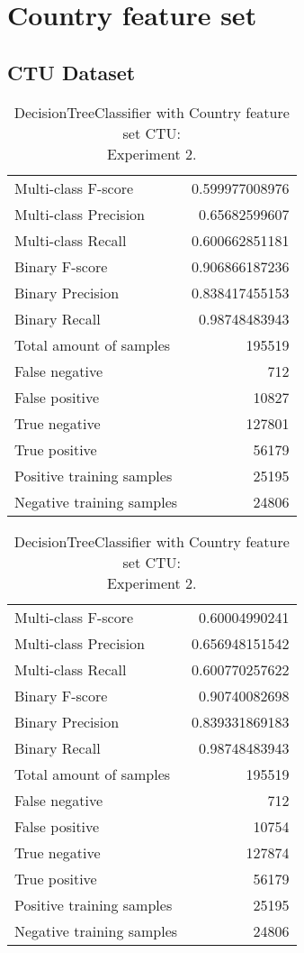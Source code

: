 \newpage
\section{Country feature set}
\subsection{CTU Dataset}

\begin{table}[H]
\begin{minipage}{0.5\textwidth}
\caption{DecisionTreeClassifier with Country feature set CTU: \\Experiment 1.}
\centering
\begin{tabular}{l r}
\toprule
Multi-class F-score & 0.599977008976 \\
Multi-class Precision & 0.65682599607 \\
Multi-class Recall & 0.600662851181 \\
\midrule
Binary F-score & 0.906866187236 \\
Binary Precision & 0.838417455153 \\
Binary Recall & 0.98748483943 \\
\midrule
Total amount of samples & 195519 \\
False negative & 712 \\
False positive & 10827 \\
True negative & 127801 \\
True positive & 56179 \\
\midrule
Positive training samples & 25195 \\
Negative training samples & 24806 \\
\bottomrule
\end{tabular}
\end{minipage}
\hfillx
\begin{minipage}{0.5\textwidth}
\caption{DecisionTreeClassifier with Country feature set CTU: \\Experiment 2.}
\centering
\begin{tabular}{l r}
\toprule
Multi-class F-score & 0.60004990241 \\
Multi-class Precision & 0.656948151542 \\
Multi-class Recall & 0.600770257622 \\
\midrule
Binary F-score & 0.90740082698 \\
Binary Precision & 0.839331869183 \\
Binary Recall & 0.98748483943 \\
\midrule
Total amount of samples & 195519 \\
False negative & 712 \\
False positive & 10754 \\
True negative & 127874 \\
True positive & 56179 \\
\midrule
Positive training samples & 25195 \\
Negative training samples & 24806 \\
\bottomrule
\end{tabular}
\end{minipage}
\end{table}

